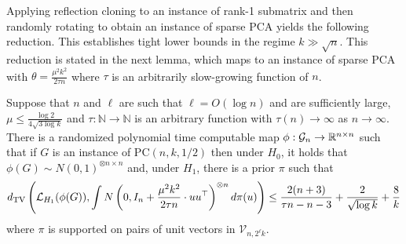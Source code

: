 \documentclass[11pt]{article}
\begin{document}
Applying reflection cloning to an instance of rank-1 submatrix and then randomly rotating to obtain an instance of sparse PCA yields the following reduction. This establishes tight lower bounds in the regime $k \gg \sqrt{n}$. This reduction is stated in the next lemma, which maps to an instance of sparse PCA with $\theta = \frac{\mu^2 k^2}{2\tau n}$ where $\tau$ is an arbitrarily slow-growing function of $n$.

\begin{lemma}
Suppose that $n$ and $\ell$ are such that $\ell = O(\log n)$ and are sufficiently large, $\mu \le \frac{\log 2}{4 \sqrt{3 \log k}}$ and $\tau : \mathbb{N} \to \mathbb{N}$ is an arbitrary function with $\tau(n) \to \infty$ as $n \to \infty$. There is a randomized polynomial time computable map $\phi : \mathcal{G}_n \to \mathbb{R}^{n \times n}$ such that if $G$ is an instance of $\text{PC}(n, k, 1/2)$ then under $H_0$, it holds that $\phi(G) \sim N(0, 1)^{\otimes n \times n}$ and, under $H_1$, there is a prior $\pi$ such that
$$d_{\text{TV}}\left( \mathcal{L}_{H_1}(\phi(G)), \int N\left(0, I_n + \frac{\mu^2 k^2}{2 \tau n} \cdot uu^\top\right)^{\otimes n} d\pi(u) \right) \le \frac{2(n + 3)}{\tau n - n - 3} + \frac{2}{\sqrt{\log k}} + \frac{8}{k}$$
where $\pi$ is supported on pairs of unit vectors in $\mathcal{V}_{n, 2^\ell k}$.
\end{lemma}
\end{document}

